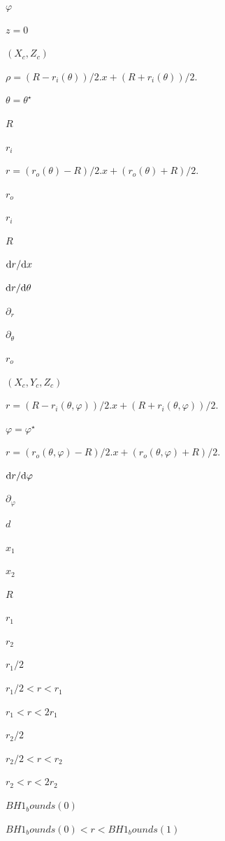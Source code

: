 \documentclass{article}
\begin{document}
$\varphi$
\pagebreak

$ z=0 $
\pagebreak

$(X_c, Z_c)$
\pagebreak

$ \rho = (R - r_i(\theta))/2. x + (R + r_i(\theta))/2. $
\pagebreak

$ \theta = \theta^\star $
\pagebreak

$ R $
\pagebreak

$ r_i $
\pagebreak

$ r = (r_o(\theta) - R)/2. x + (r_o(\theta) + R)/2. $
\pagebreak

$ r_o $
\pagebreak

$r_i$
\pagebreak

$ R$
\pagebreak

$ {\rm d} r / {\rm d} x$
\pagebreak

$ {\rm d} r / {\rm d} \theta$
\pagebreak

$ \partial_r $
\pagebreak

$ \partial_\theta $
\pagebreak

$r_o$
\pagebreak

$(X_c, Y_c, Z_c)$
\pagebreak

$ r = (R - r_i(\theta, \varphi))/2. x + (R + r_i(\theta, \varphi))/2. $
\pagebreak

$ \varphi = \varphi^\star $
\pagebreak

$ r = (r_o(\theta, \varphi) - R)/2. x + (r_o(\theta, \varphi) + R)/2. $
\pagebreak

$ {\rm d} r / {\rm d} \varphi$
\pagebreak

$ \partial_\varphi $
\pagebreak

$ d $
\pagebreak

$ x_1 $
\pagebreak

$ x_2 $
\pagebreak

$ R $
\pagebreak

$ r_1 $
\pagebreak

$ r_2 $
\pagebreak

$ r_1/2 $
\pagebreak

$ r_1/2 < r < r_1 $
\pagebreak

$ r_1 < r < 2 r_1 $
\pagebreak

$ r_2/2 $
\pagebreak

$ r_2/2 < r < r_2 $
\pagebreak

$ r_2 < r < 2 r_2 $
\pagebreak

$ BH1_bounds(0) $
\pagebreak

$ BH1_bounds(0) < r < BH1_bounds(1) $
\pagebreak
\end{document}
